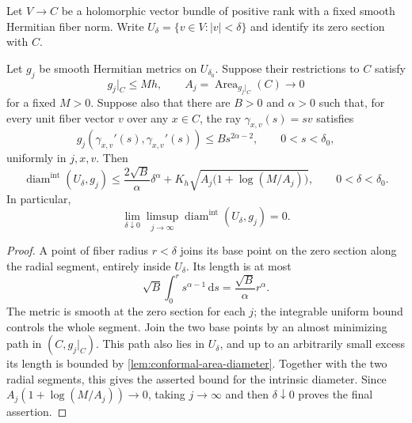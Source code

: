 Let $V\to C$ be a holomorphic vector bundle of positive rank with a fixed smooth Hermitian fiber norm. Write $U_\delta=\{v\in V:|v|<\delta\}$ and identify its zero section with $C$.

\begin{proposition}\label{prop:radial-tube-diameter}
Let $g_j$ be smooth Hermitian metrics on $U_{\delta_0}$. Suppose their restrictions to $C$ satisfy
\[
 g_j|_C\leq M h,\qquad
 A_j=\operatorname{Area}_{g_j|_C}(C)\longrightarrow0
\]
for a fixed $M>0$. Suppose also that there are $B>0$ and $\alpha>0$ such that, for every unit fiber vector $v$ over any $x\in C$, the ray $\gamma_{x,v}(s)=sv$ satisfies
\[
 g_j(\gamma_{x,v}'(s),\gamma_{x,v}'(s))
       \leq B s^{2\alpha-2},
       \qquad 0<s<\delta_0,
\]
uniformly in $j,x,v$. Then
\[
 \operatorname{diam}^{\mathrm{int}}(U_\delta,g_j)
 \leq\frac{2\sqrt B}{\alpha}\delta^\alpha
       +K_h\sqrt{A_j\bigl(1+\log(M/A_j)\bigr)},
       \qquad 0<\delta<\delta_0.
\]
In particular,
\[
 \lim_{\delta\downarrow0}\limsup_{j\to\infty}
       \operatorname{diam}^{\mathrm{int}}(U_\delta,g_j)=0.
\]
\end{proposition}
\begin{proof}
A point of fiber radius $r<\delta$ joins its base point on the zero section along the radial segment, entirely inside $U_\delta$. Its length is at most
\[
 \sqrt B\int_0^r s^{\alpha-1}\,\mathrm{d}s
       =\frac{\sqrt B}{\alpha}r^\alpha.
\]
The metric is smooth at the zero section for each $j$; the integrable uniform bound controls the whole segment. Join the two base points by an almost minimizing path in $(C,g_j|_C)$. This path also lies in $U_\delta$, and up to an arbitrarily small excess its length is bounded by \cref{lem:conformal-area-diameter}. Together with the two radial segments, this gives the asserted bound for the intrinsic diameter. Since $A_j(1+\log(M/A_j))\to0$, taking $j\to\infty$ and then $\delta\downarrow0$ proves the final assertion.
\end{proof}

